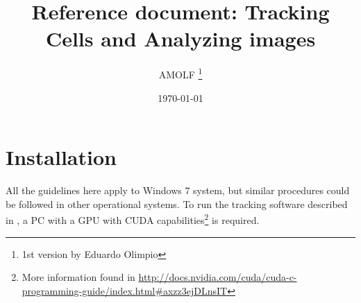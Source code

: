 \documentclass[12pt]{article}
\title{Reference document: Tracking Cells and Analyzing images}
\author{AMOLF \footnote{1st version by Eduardo Olimpio}}
\date{\today}
\begin{document}
\maketitle

\section{Installation}

All the guidelines here apply to Windows 7 system, but similar procedures could be followed in other operational systems. To run the tracking software described in \cite{Amat2014}, a PC with a GPU with CUDA capabilities\footnote{More information found in \url{http://docs.nvidia.com/cuda/cuda-c-programming-guide/index.html#axzz3ejDLnsIT}} is required.



\end{document}
